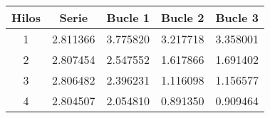 \begin{tabular}{|c|c|c|c|c|}
\hline \textbf{Hilos} & \textbf{Serie} & \textbf{Bucle 1} & \textbf{Bucle 2} & \textbf{Bucle 3
}\\ 
\hline 1 & 2.811366 & 3.775820 & 3.217718 & 3.358001
\\ 
\hline 2 & 2.807454 & 2.547552 & 1.617866 & 1.691402
\\ 
\hline 3 & 2.806482 & 2.396231 & 1.116098 & 1.156577
\\ 
\hline 4 & 2.804507 & 2.054810 & 0.891350 & 0.909464
\\ 
\hline\end{tabular}